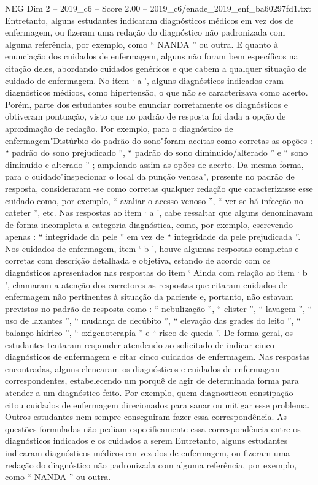 \begin{textsample}{NEG Dim 2 – 2019\_c6 – Score 2.00 – 2019\_c6/enade\_2019\_enf\_ba60297fd1.txt}
Entretanto, alguns estudantes indicaram diagnósticos médicos em vez dos de enfermagem, ou fizeram uma redação do diagnóstico não padronizada com alguma referência, por exemplo, como “ NANDA ” ou outra.
E quanto à enunciação dos cuidados de enfermagem, alguns não foram bem específicos na citação deles, abordando cuidados genéricos e que cabem a qualquer situação de cuidado de enfermagem.
No item ‘ a ’, alguns diagnósticos indicados eram diagnósticos médicos, como hipertensão, o que não se caracterizava como acerto.
Porém, parte dos estudantes soube enunciar corretamente os diagnósticos e obtiveram pontuação, visto que no padrão de resposta foi dada a opção de aproximação de redação.
Por exemplo, para o diagnóstico de enfermagem"Distúrbio do padrão do sono"foram aceitas como corretas as opções : “ padrão do sono prejudicado ”, “ padrão do sono diminuído/alterado ” e “ sono diminuído e alterado ” ; ampliando assim as opões de acerto.
Da mesma forma, para o cuidado"inspecionar o local da punção venosa", presente no padrão de resposta, consideraram -se como corretas qualquer redação que caracterizasse esse cuidado como, por exemplo, “ avaliar o acesso venoso ”, “ ver se há infecção no cateter ”, etc.
Nas respostas ao item ‘ a ’, cabe ressaltar que alguns denominavam de forma incompleta a categoria diagnóstica, como, por exemplo, escrevendo apenas : “ integridade da pele ” em vez de “ integridade da pele prejudicada ”.
Nos cuidados de enfermagem, item ‘ b ’, houve algumas respostas completas e corretas com descrição detalhada e objetiva, estando de acordo com os diagnósticos apresentados nas respostas do item ‘ Ainda com relação ao item ‘ b ’, chamaram a atenção dos corretores as respostas que citaram cuidados de enfermagem não pertinentes à situação da paciente e, portanto, não estavam previstas no padrão de resposta como : “ nebulização ”, “ clister ”, “ lavagem ”, “ uso de laxantes ”, “ mudança de decúbito ”, “ elevação das grades do leito ”, “ balanço hídrico ”, “ oxigenoterapia ” e “ risco de queda ”.
De forma geral, os estudantes tentaram responder atendendo ao solicitado de indicar cinco diagnósticos de enfermagem e citar cinco cuidados de enfermagem.
Nas respostas encontradas, alguns elencaram os diagnósticos e cuidados de enfermagem correspondentes, estabelecendo um porquê de agir de determinada forma para atender a um diagnóstico feito.
Por exemplo, quem diagnosticou constipação citou cuidados de enfermagem direcionados para sanar ou mitigar esse problema.
Outros estudantes nem sempre conseguiram fazer essa correspondência.
As questões formuladas não pediam especificamente essa correspondência entre os diagnósticos indicados e os cuidados a serem Entretanto, alguns estudantes indicaram diagnósticos médicos em vez dos de enfermagem, ou fizeram uma redação do diagnóstico não padronizada com alguma referência, por exemplo, como “ NANDA ” ou outra.

\end{textsample}
